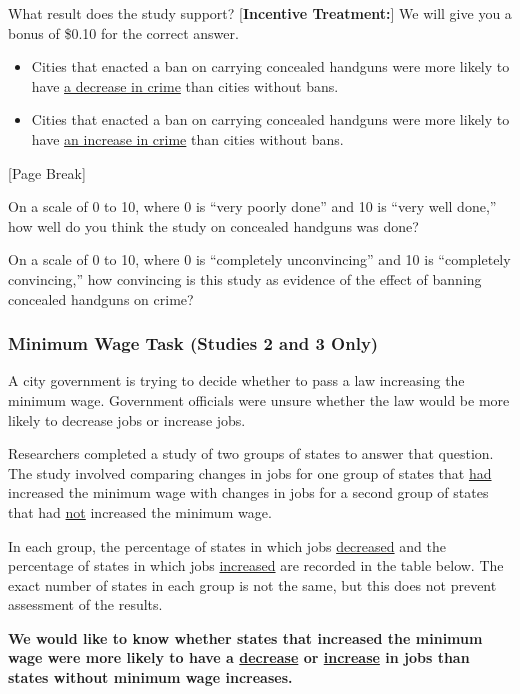 \documentclass[12pt, letterpaper]{article}
\begin{document}
What result does the study support? {[}\textbf{Incentive Treatment:}{]} We will give you a bonus of \$0.10 for the correct answer.
\begin{itemize}
  \item Cities that enacted a ban on carrying concealed handguns were more likely to have \uline{a decrease in crime} than cities without bans.
  \item Cities that enacted a ban on carrying concealed handguns were more likely to have \uline{an increase in crime} than cities without bans.
\end{itemize}

\begin{center}
{[}Page Break{]}\\
\end{center}

On a scale of 0 to 10, where 0 is ``very poorly done'' and 10 is ``very well done,'' how well do you think the study on concealed handguns was done?

\bigskip
On a scale of 0 to 10, where 0 is ``completely unconvincing'' and 10 is ``completely convincing,'' how convincing is this study as evidence of the effect of banning concealed handguns on crime?

\subsubsection{Minimum Wage Task (Studies 2 and 3 Only)}
A city government is trying to decide whether to pass a law increasing the minimum wage. Government officials were unsure whether the law would be more likely to decrease jobs or increase jobs.
 
\medskip
Researchers completed a study of two groups of states to answer that question. The study involved comparing changes in jobs for one group of states that \uline{had} increased the minimum wage with changes in jobs for a second group of states that had \uline{not} increased the minimum wage.
 
\medskip
In each group, the percentage of states in which jobs \uline{decreased} and the percentage of states in which jobs \uline{increased} are recorded in the table below. The exact number of states in each group is not the same, but this does not prevent assessment of the results.
 
\medskip
\textbf{We would like to know whether states that increased the minimum wage were more likely to have a \underline{decrease} or \underline{increase} in jobs than states without minimum wage increases.}
\end{document}
